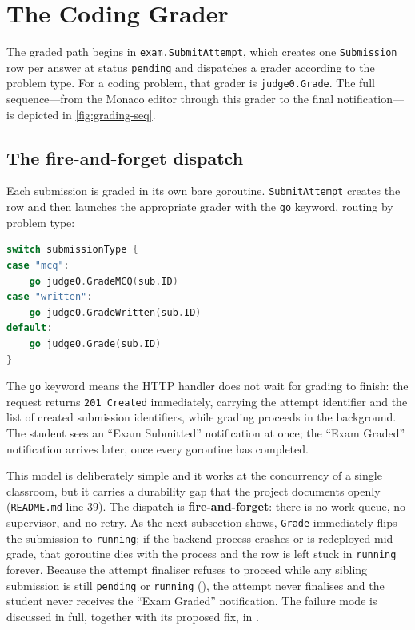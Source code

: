 \section{The Coding Grader}\label{sec:grading-coding}

The graded path begins in \texttt{exam.SubmitAttempt}, which creates one \texttt{Submission}
row per answer at status \texttt{pending} and dispatches a grader according to the problem
type. For a coding problem, that grader is \texttt{judge0.Grade}. The full sequence---from the
Monaco editor through this grader to the final notification---is depicted in
\cref{fig:grading-seq}.



\subsection{The fire-and-forget dispatch}\label{sec:grading-dispatch}

Each submission is graded in its own bare goroutine. \texttt{SubmitAttempt} creates the row and
then launches the appropriate grader with the \texttt{go} keyword, routing by problem type:

\begin{lstlisting}[language=Go,caption={Per-submission grader dispatch in \texttt{SubmitAttempt}.},label={lst:dispatch}]
switch submissionType {
case "mcq":
	go judge0.GradeMCQ(sub.ID)
case "written":
	go judge0.GradeWritten(sub.ID)
default:
	go judge0.Grade(sub.ID)
}
\end{lstlisting}

The \texttt{go} keyword means the HTTP handler does not wait for grading to finish: the request
returns \texttt{201 Created} immediately, carrying the attempt identifier and the list of
created submission identifiers, while grading proceeds in the background. The student sees an
``Exam Submitted'' notification at once; the ``Exam Graded'' notification arrives later, once
every goroutine has completed.

This model is deliberately simple and it works at the concurrency of a single classroom, but
it carries a durability gap that the project documents openly (\texttt{README.md} line
39). The dispatch is \textbf{fire-and-forget}: there is no work queue, no supervisor, and no
retry. As the next subsection shows, \texttt{Grade} immediately flips the submission to
\texttt{running}; if the backend process crashes or is redeployed mid-grade, that goroutine
dies with the process and the row is left stuck in \texttt{running} forever. Because the
attempt finaliser refuses to proceed while any sibling submission is still
\texttt{pending} or \texttt{running} (), the attempt never
finalises and the student never receives the ``Exam Graded'' notification. The failure mode is
discussed in full, together with its proposed fix, in .

